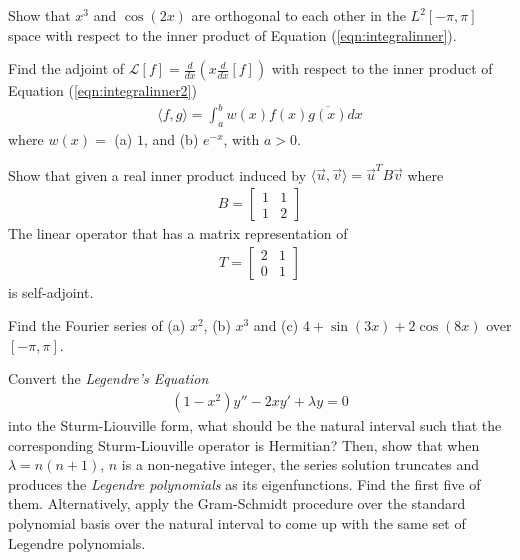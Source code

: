 \begin{Exercise}
Show that $x^3$ and $\cos(2x)$ are orthogonal to each other in the $L^2[-\pi, \pi]$ space with respect to the inner product of Equation (\ref{eqn:integralinner}).
\end{Exercise}

\begin{Exercise}
Find the adjoint of $\mathcal{L}[f] = \frac{d}{dx}(x\frac{d}{dx}[f])$ with respect to the inner product of Equation (\ref{eqn:integralinner2})
\begin{align*}
\langle f,g \rangle = \int_a^b w(x) f(x) \overline{g(x)} dx    
\end{align*}
where $w(x) =$ (a) $1$, and (b) $e^{-x}$, with $a > 0$.
\end{Exercise}

\begin{Exercise}
Show that given a real inner product induced by $\langle \vec{u},\vec{v} \rangle = \vec{u}^TB\vec{v}$ where
\begin{align*}
B = 
\begin{bmatrix}
1 & 1 \\
1 & 2
\end{bmatrix}
\end{align*}
The linear operator that has a matrix representation of
\begin{align*}
T = 
\begin{bmatrix}
2 & 1 \\
0 & 1
\end{bmatrix}
\end{align*}
is self-adjoint.
\end{Exercise}

\begin{Exercise}
Find the Fourier series of (a) $x^2$, (b) $x^3$ and (c) $4+\sin(3x)+2\cos(8x)$ over $[-\pi, \pi]$.
\end{Exercise}

\begin{Exercise}
Convert the \textit{Legendre's Equation}
\begin{align*}
(1-x^2) y'' - 2xy' + \lambda y = 0
\end{align*}
into the Sturm-Liouville form, what should be the natural interval such that the corresponding Sturm-Liouville operator is Hermitian? Then, show that when $\lambda = n(n+1)$, $n$ is a non-negative integer, the series solution truncates and produces the \textit{Legendre polynomials} as its eigenfunctions. Find the first five of them. Alternatively, apply the Gram-Schmidt procedure over the standard polynomial basis over the natural interval to come up with the same set of Legendre polynomials.
\end{Exercise}
